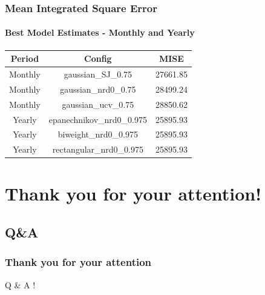 \documentclass{beamer} %
\theoremstyle{definition}
\begin{document}
	\begin{frame}
		\frametitle{Mean Integrated Square Error}
		\framesubtitle{Best Model Estimates - Monthly and Yearly}
		
		\centering
		\begin{table}[h]
			\centering
			\begin{tabular}{ccc}
				\hline
				Period  & Config                      & MISE            \\
				\hline
				Monthly & gaussian\_SJ\_0.75          & 27661.85  \\
				Monthly & gaussian\_nrd0\_0.75        & 28499.24  \\
				Monthly & gaussian\_ucv\_0.75         & 28850.62  \\
				\hline			
				Yearly  & epanechnikov\_nrd0\_0.975   & 25895.93  \\
				Yearly  & biweight\_nrd0\_0.975       & 25895.93  \\
				Yearly  & rectangular\_nrd0\_0.975     & 25895.93  \\
				\hline
			\end{tabular}
		\end{table}
	\end{frame}
	
	\section{Thank you for your attention!}
	\subsection{Q\&A}
	
	\begin{frame}
	\frametitle{Thank you for your attention}
	\begin{center}
		Q \& A !
	\end{center}
	\end{frame}
	
\end{document}
